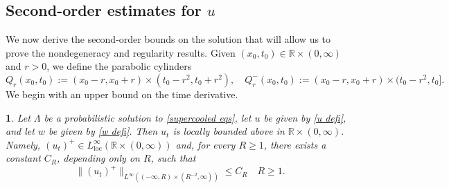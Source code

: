 \documentclass{article}
\numberwithin{equation}{section}
\numberwithin{figure}{section}
\theoremstyle{plain}
\theoremstyle{plain}
\newtheorem{prop}[thm]{\protect\propositionname}
\theoremstyle{plain}
\theoremstyle{plain}
\theoremstyle{definition}
\theoremstyle{remark}
\def\R{{\mathbb{R}}}
\providecommand{\propositionname}{Proposition}
\begin{document}
\subsection{Second-order estimates for $u$}
We now derive the second-order bounds on the solution that will allow us to prove the nondegeneracy and regularity results. Given $(x_0,t_0) \in \R\times (0,\infty)$ and $r>0$, we define the parabolic cylinders
\begin{equation}
    Q_r(x_0,t_0):=(x_0-r,x_0+r)\times (t_0-r^2,t_0+r^2), \quad Q_r^-(x_0,t_0):=(x_0-r,x_0+r)\times (t_0-r^2,t_0].
\end{equation}
We begin with an upper bound on the time derivative.
\begin{prop}\label{prop: semiconvexity} Let $\Lambda$ be a probabilistic solution to \eqref{supercooled eqs}, let $u$ be given by \eqref{u defi}, and let $w$ be given by \eqref{w defi}.  Then $u_t$ is locally bounded above in $\R \times (0,\infty)$. Namely, $(u_t)^+ \in L^{\infty}_{\operatorname{loc}}(\R \times (0,\infty))$ and, for every $R\geq1$, there exists a constant $C_R$, depending only on $R$, such that
    \begin{equation}
    \|(u_t)^+\|_{L^{\infty}((-\infty,R)\times(R^{-2},\infty))} \leq C_R \quad R\geq 1.
\end{equation}
\end{prop}
\end{document}
